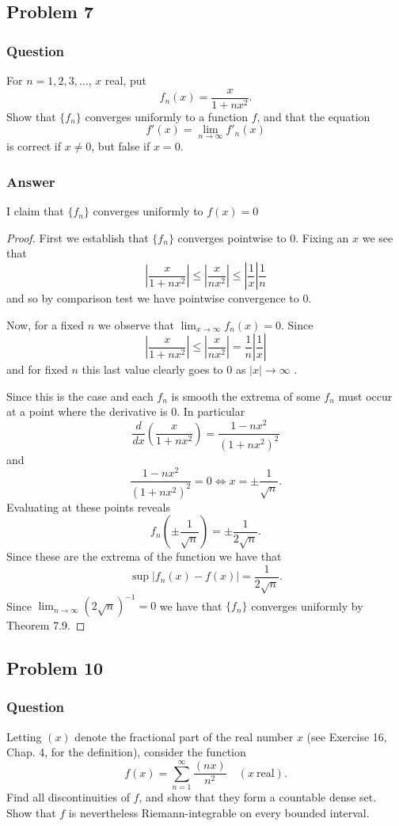 \documentclass[12pt]{article}
\begin{document}
\subsection{Problem 7}

\subsubsection{Question}
For $n= 1,2,3,\dots$, $x$ real, put
\[f_n(x)= \frac{x}{1+n x^2}.\]
Show that $\{f_n\}$ converges uniformly to a function $f$, and that the equation 
\[f'(x)= \lim_{n \to \infty} f'_n(x)\]
is correct if $x \neq 0$, but false if $ x = 0$.
\subsubsection{Answer}
I claim that $\{f_n\}$ converges uniformly to $f(x) = 0$
\begin{proof}
First we establish that $\{f_n\}$ converges pointwise to $0$. Fixing an $x$ we see that
\[ \left| \frac{x}{1+nx^2} \right| \leq \left| \frac{x}{n x^2} \right| \leq \left| \frac{1}{x}\right| \frac{1}{n} \]
and so by comparison test we have pointwise convergence to $0$.

Now, for a fixed $n$ we observe that $\lim_{x \to \infty} f_n(x) = 0$. Since
\[ \left| \frac{x}{1+nx^2}\right| \leq \left|  \frac{x}{nx^2}\right| = \frac{1}{n} \left| \frac{1}{x}  \right| \]
and for fixed $n$ this last value clearly goes to $0$ as $|x|\to \infty$ .

Since this is the case and each $f_n$ is smooth the extrema of some $f_n$ must occur at a point where the derivative is $0$. In particular
\[\frac{d}{dx} \left( \frac{x}{1+ n x^2} \right) = \frac{1-n x^2}{\left(1+n x^2\right)^2}\]
and
\[\frac{1-n x^2}{\left(1+n x^2\right)^2}=0 \Leftrightarrow x = \pm \frac{1}{\sqrt{n}}. \]
Evaluating at these points reveals
\[f_n\left(\pm \frac{1}{\sqrt{n}} \right) = \pm \frac{1}{2\sqrt{n}} .\]
Since these are the extrema of the function we have that 
\[\sup \left| f_n(x) - f(x)\right| = \frac{1}{2\sqrt{n}}.\]
Since $\lim_{n\to \infty} (2 \sqrt{n})^{-1}=0$ we have that $\{f_n\}$ converges uniformly by Theorem 7.9.


\end{proof}


\subsection{Problem 10}

\subsubsection{Question}
Letting $(x)$ denote the fractional part of the real number $x$ (see Exercise 16, Chap. 4, for the definition), consider the function
\[f(x)= \sum_{n=1}^\infty \frac{(n x)}{n^2} \quad (x\mathrm{\ real}).\]
Find all discontinuities of $f$, and show that they form a countable dense set. Show that $f$ is nevertheless Riemann-integrable on every bounded interval.
\end{document}
